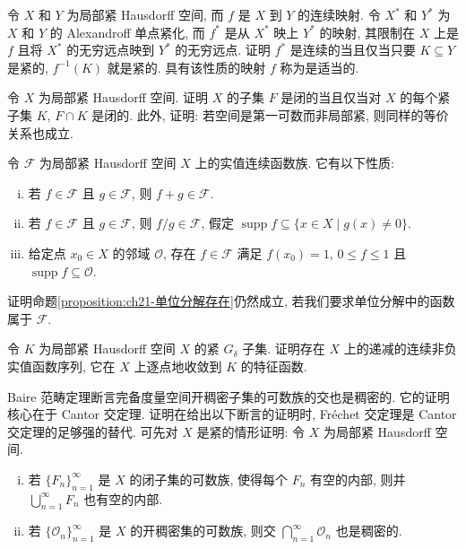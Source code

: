 \documentclass[../../main.tex]{subfiles}
\begin{document}
\begin{exercise}\label{exercise:ch21-14}
令 $X$ 和 $Y$ 为局部紧 Hausdorff 空间, 而 $f$ 是 $X$ 到 $Y$ 的连续映射. 令 $X^{*}$ 和 $Y^{*}$ 为 $X$ 和 $Y$ 的 Alexandroff 单点紧化, 而 $f^{*}$ 是从 $X^{*}$ 映上 $Y^{*}$ 的映射, 其限制在 $X$ 上是 $f$ 且将 $X^{*}$ 的无穷远点映到 $Y^{*}$ 的无穷远点. 证明 $f^{*}$ 是连续的当且仅当只要 $K\subseteq Y$ 是紧的, $f^{-1}(K)$ 就是紧的. 具有该性质的映射 $f$ 称为是适当的.
\end{exercise}

\begin{exercise}\label{exercise:ch21-15}
令 $X$ 为局部紧 Hausdorff 空间. 证明 $X$ 的子集 $F$ 是闭的当且仅当对 $X$ 的每个紧子集 $K$, $F\cap K$ 是闭的. 此外, 证明: 若空间是第一可数而非局部紧, 则同样的等价关系也成立.
\end{exercise}

\begin{exercise}\label{exercise:ch21-16}
令 $\mathcal{F}$ 为局部紧 Hausdorff 空间 $X$ 上的实值连续函数族. 它有以下性质:
\begin{enumerate}[(i)]
\item 若 $f\in\mathcal{F}$ 且 $g\in\mathcal{F}$, 则 $f+g\in\mathcal{F}$.
\item 若 $f\in\mathcal{F}$ 且 $g\in\mathcal{F}$, 则 $f/g\in\mathcal{F}$, 假定 $\operatorname{supp}f\subseteq\{x\in X\mid g(x)\neq 0\}$.
\item 给定点 $x_{0}\in X$ 的邻域 $\mathcal{O}$, 存在 $f\in\mathcal{F}$ 满足 $f(x_{0})=1$, $0\leqslant f\leqslant 1$ 且 $\operatorname{supp}f\subseteq\mathcal{O}$.
\end{enumerate}
证明命题\cref{proposition:ch21-单位分解存在}仍然成立, 若我们要求单位分解中的函数属于 $\mathcal{F}$.
\end{exercise}

\begin{exercise}\label{exercise:ch21-17}
令 $K$ 为局部紧 Hausdorff 空间 $X$ 的紧 $G_{\delta}$ 子集. 证明存在 $X$ 上的递减的连续非负实值函数序列, 它在 $X$ 上逐点地收敛到 $K$ 的特征函数.
\end{exercise}

\begin{exercise}\label{exercise:ch21-18}
Baire 范畴定理断言完备度量空间开稠密子集的可数族的交也是稠密的. 它的证明核心在于 Cantor 交定理. 证明在给出以下断言的证明时, Fr\'echet 交定理是 Cantor 交定理的足够强的替代. 可先对 $X$ 是紧的情形证明: 令 $X$ 为局部紧 Hausdorff 空间.
\begin{enumerate}[(i)]
\item 若 $\{F_{n}\}_{n=1}^{\infty}$ 是 $X$ 的闭子集的可数族, 使得每个 $F_{n}$ 有空的内部, 则并 $\bigcup_{n=1}^{\infty}F_{n}$ 也有空的内部.
\item 若 $\{\mathcal{O}_{n}\}_{n=1}^{\infty}$ 是 $X$ 的开稠密集的可数族, 则交 $\bigcap_{n=1}^{\infty}\mathcal{O}_{n}$ 也是稠密的.
\end{enumerate}
\end{exercise}
\end{document}
